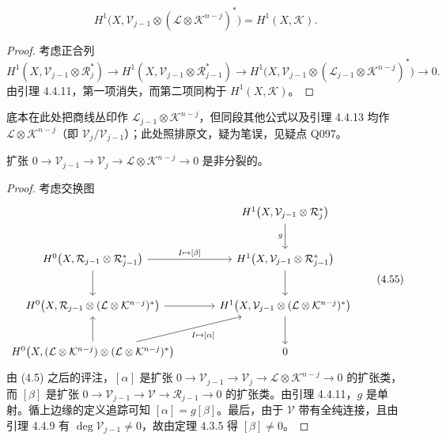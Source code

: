\begin{corollary}
\[
H^1\bigl(X,\mathcal{V}_{j-1}\otimes(\mathcal{L}\otimes\mathcal{K}^{n-j})^*\bigr)=H^1(X,\mathcal{K}).
\]
\end{corollary}

\begin{proof}
考虑正合列
\[
H^1(X,\mathcal{V}_{j-1}\otimes\mathcal{R}_j^*)\longrightarrow
H^1(X,\mathcal{V}_{j-1}\otimes\mathcal{R}_{j-1}^*)\longrightarrow
H^1\bigl(X,\mathcal{V}_{j-1}\otimes(\mathcal{L}_{j-1}\otimes\mathcal{K}^{n-j})^*\bigr)\longrightarrow0.
\]
由引理 4.4.11，第一项消失，而第二项同构于 $H^1(X,\mathcal{K})$。
\end{proof}

\begin{annote}
底本在此处把商线丛印作 $\mathcal{L}_{j-1}\otimes\mathcal{K}^{n-j}$，但同段其他公式以及引理 4.4.13 均作 $\mathcal{L}\otimes\mathcal{K}^{n-j}$（即 $\mathcal{V}_j/\mathcal{V}_{j-1}$）；此处照排原文，疑为笔误，见疑点 Q097。
\end{annote}

\begin{lemma}
扩张 $0\to\mathcal{V}_{j-1}\to\mathcal{V}_j\to\mathcal{L}\otimes\mathcal{K}^{n-j}\to0$ 是非分裂的。
\end{lemma}

\begin{proof}
考虑交换图
\begin{equation}
\begin{tikzcd}[row sep=2.4em, column sep=3.4em]
& H^1\bigl(X,\mathcal{V}_{j-1}\otimes\mathcal{R}_j^*\bigr)\arrow[d,"g"']\\
H^0\bigl(X,\mathcal{R}_{j-1}\otimes\mathcal{R}_{j-1}^*\bigr)\arrow[r,"{I\mapsto\lbrack\beta\rbrack}"]\arrow[d]
& H^1\bigl(X,\mathcal{V}_{j-1}\otimes\mathcal{R}_{j-1}^*\bigr)\arrow[d]\\
H^0\bigl(X,\mathcal{R}_{j-1}\otimes(\mathcal{L}\otimes\mathcal{K}^{n-j})^*\bigr)\arrow[r]
& H^1\bigl(X,\mathcal{V}_{j-1}\otimes(\mathcal{L}\otimes\mathcal{K}^{n-j})^*\bigr)\arrow[d]\\
H^0\bigl(X,(\mathcal{L}\otimes\mathcal{K}^{n-j})\otimes(\mathcal{L}\otimes\mathcal{K}^{n-j})^*\bigr)\arrow[u]\arrow[ur,"{I\mapsto\lbrack\alpha\rbrack}"']
& 0
\end{tikzcd}
\tag{4.55}
\end{equation}
由 (4.5) 之后的评注，$[\alpha]$ 是扩张 $0\to\mathcal{V}_{j-1}\to\mathcal{V}_j\to\mathcal{L}\otimes\mathcal{K}^{n-j}\to0$ 的扩张类，而 $[\beta]$ 是扩张 $0\to\mathcal{V}_{j-1}\to\mathcal{V}\to\mathcal{R}_{j-1}\to0$ 的扩张类。由引理 4.4.11，$g$ 是单射。循上边缘的定义追踪可知 $[\alpha]=g[\beta]$。最后，由于 $\mathcal{V}$ 带有全纯连接，且由引理 4.4.9 有 $\deg\mathcal{V}_{j-1}\ne0$，故由定理 4.3.5 得 $[\beta]\ne0$。
\end{proof}


